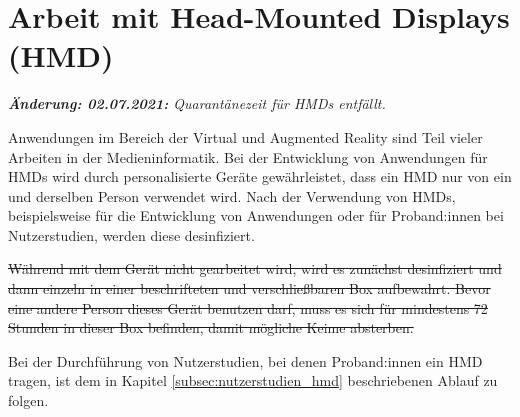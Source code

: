 \section{Arbeit mit Head-Mounted Displays (HMD)}\label{sec:hmd}
\emph{\textbf{Änderung: 02.07.2021:} Quarantänezeit für HMDs entfällt.}

\medskip
\noindent
Anwendungen im Bereich der Virtual und Augmented Reality sind Teil vieler Arbeiten in der Medieninformatik.
Bei der Entwicklung von Anwendungen für HMDs wird durch personalisierte Geräte gewährleistet, dass ein HMD nur von ein und derselben Person verwendet wird.
Nach der Verwendung von HMDs, beispielsweise für die Entwicklung von Anwendungen oder für Proband:innen bei Nutzerstudien, werden diese desinfiziert.

\sout{Während mit dem Gerät nicht gearbeitet wird, wird es zunächst desinfiziert und dann einzeln in einer beschrifteten und verschließbaren Box aufbewahrt. Bevor eine andere Person dieses Gerät benutzen darf, muss es sich für mindestens 72 Stunden in dieser Box befinden, damit mögliche Keime absterben.}

\medskip
\noindent
Bei der Durchführung von Nutzerstudien, bei denen Proband:innen ein HMD tragen, ist dem in Kapitel \ref{subsec:nutzerstudien_hmd} beschriebenen Ablauf zu folgen.
